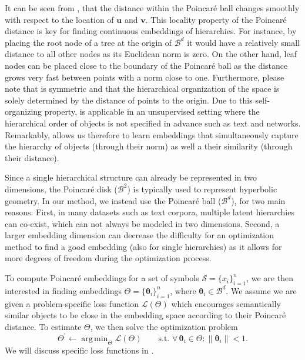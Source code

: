 \documentclass[11pt]{article}
\renewcommand{\vec}[1]{\bm{#1}}
\newcommand{\vu}{\vec{u}}
\newcommand{\vv}{\vec{v}}
\newcommand{\vt}{\vec{\theta}}
\newcommand{\lossfn}{\mathcal{L}}
\newcommand{\Set}[1]{\mathcal{#1}}
\newcommand{\manifold}[1]{\mathcal{#1}}
\DeclareMathOperator*{\argmin}{arg\,min}
\begin{document}
It can be seen from , that the distance within the Poincaré
ball changes smoothly with respect to the location of \(\vu\) and \(\vv\). This
locality property of the Poincaré distance is key for finding continuous
embeddings of hierarchies. For instance, by placing the root node of a tree at
the origin of \(\manifold{B}^d\) it would have a relatively small distance to all
other nodes as its Euclidean norm is zero. On the other hand, leaf nodes can be
placed close to the boundary of the Poincaré ball as the distance grows very
fast between points with a norm close to one. Furthermore, please note that
 is symmetric and that the hierarchical organization of the
space is solely determined by the distance of points to the origin. Due to this
self-organizing property,  is applicable in an unsupervised
setting where the hierarchical order of objects is not specified in advance such
as text and networks. Remarkably,  allows us therefore to
learn embeddings that simultaneously capture the hierarchy of objects (through
their norm) as well a their similarity (through their distance).

Since a single hierarchical structure can already be represented in two
dimensions, the Poincaré disk (\(\manifold{B}^2\)) is typically used to represent
hyperbolic geometry. In our method, we instead use the Poincaré ball
(\(\manifold{B}^d\)), for two main reasons: First, in many datasets such as text
corpora, multiple latent hierarchies can co-exist, which can not always be
modeled in two dimensions. Second, a larger embedding dimension can decrease the
difficulty for an optimization method to find a good embedding (also for single
hierarchies) as it allows for more degrees of freedom during the optimization
process.

To compute Poincaré embeddings for a set of symbols \(\Set{S} = \{x_i\}_{i=1}^n\), we
are then interested in finding embeddings \(\Theta = \{\vt_i\}_{i=1}^n\), where \(\vt_i \in
\manifold{B}^d\). We assume we are given a problem-specific loss function
\(\lossfn(\Theta)\) which encourages semantically similar objects to be close in the
embedding space according to their Poincaré distance. To estimate \(\Theta\), we then
solve the optimization problem
\begin{equation}
\Theta^\prime \gets \argmin_{\Theta} \lossfn(\Theta) \quad\quad \text{s.t. } \forall\, \vt_i \in \Theta: \|\vt_i\| < 1 .\label{eq:loss}
\end{equation}
We will discuss specific loss functions in .
\end{document}

